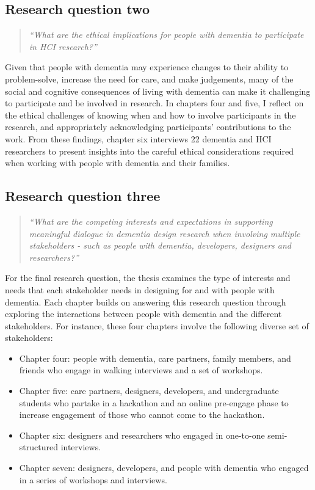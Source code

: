 \subsection{Research question two}
\label{RQ2}
\begin{quote}
\textit{``What are the ethical implications for people with dementia to participate in HCI research?''}
\end{quote}
Given that people with dementia may experience changes to their ability to problem-solve, increase the need for care, and make judgements, many of the social and cognitive consequences of living with dementia can make it challenging to participate and be involved in research. In chapters four and five, I reflect on the ethical challenges of knowing when and how to involve participants in the research, and appropriately acknowledging participants' contributions to the work. From these findings, chapter six interviews 22 dementia and HCI researchers to present insights into the careful ethical considerations required when working with people with dementia and their families.

\subsection{Research question three}
\label{RQ3}
\begin{quote}
\textit{``What are the competing interests and expectations in supporting meaningful dialogue in dementia design research when involving multiple stakeholders - such as people with dementia, developers, designers and researchers?''}
\end{quote}
For the final research question, the thesis examines the type of interests and needs that each stakeholder needs in designing for and with people with dementia. Each chapter builds on answering this research question through exploring the interactions between people with dementia and the different stakeholders. For instance, these four chapters involve the following diverse set of stakeholders:
\begin{itemize}
\item Chapter four: people with dementia, care partners, family members, and friends who engage in walking interviews and a set of workshops.
\item Chapter five: care partners, designers, developers, and undergraduate students who partake in a hackathon and an online pre-engage phase to increase engagement of those who cannot come to the hackathon.
\item Chapter six: designers and researchers who engaged in one-to-one semi-structured interviews.
\item Chapter seven: designers, developers, and people with dementia who engaged in a series of workshops and interviews.
\end{itemize}

